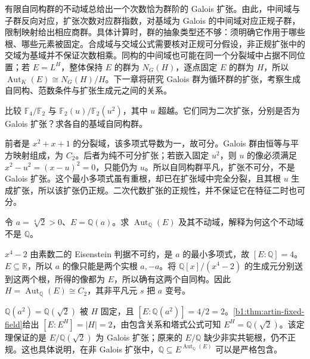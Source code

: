 




\begin{chaptersummary}
	有限自同构群的不动域总给出一个次数恰为群阶的 Galois 扩张。由此，中间域与子群反向对应，扩张次数对应群指数，对基域为 Galois 的中间域对应正规子群，限制映射给出相应商群。具体计算时，群的抽象类型还不够：须明确它作用于哪些根、哪些元素被固定。合成域与交域公式需要核对正规可分假设，非正规扩张中的交域为基域并不保证次数相乘。同构的中间域也可能在同一个分裂域中占据不同位置；若 \(E=L^H\)，整体保持 \(E\) 的群为 \(N_G(H)\)，逐点固定 \(E\) 的群为 \(H\)，所以 \(\operatorname{Aut}_K(E)\cong N_G(H)/H\)。下一章将研究 Galois 群为循环群的扩张，考察生成自同构、范数条件与扩张生成元之间的关系。
\end{chaptersummary}

\BookExercises

\begin{exercise}\label{b1:ex:19-characteristic-two}
	比较 \(\mathbb F_4/\mathbb F_2\) 与 \(\mathbb F_2(u)/\mathbb F_2(u^2)\)，其中 \(u\) 超越。它们同为二次扩张，分别是否为 Galois 扩张？求各自的基域自同构群。
\end{exercise}
\begin{solution}
	前者是 \(x^2+x+1\) 的分裂域，该多项式导数为一，故可分。Galois 群由恒等与平方映射组成，为 \(C_2\)。后者为纯不可分扩张；若嵌入固定 \(u^2\)，则 \(u\) 的像必须满足 \(x^2-u^2=(x-u)^2=0\)，只能仍为 \(u\)。所以自同构群平凡，扩张不可分，不是 Galois 扩张。这个最小多项式虽有重根，却已在扩张域中完全分裂，且其根 \(u\) 生成扩张，所以该扩张仍正规。二次代数扩张的正规性，并不保证它在特征二时也可分。
\end{solution}

\begin{exercise}\label{b1:ex:19-real-fourth-root}
	令 \(a=\sqrt[4]2>0\)、\(E=\mathbb Q(a)\)。求 \(\operatorname{Aut}_{\mathbb Q}(E)\) 及其不动域，解释为何这个不动域不是 \(\mathbb Q\)。
\end{exercise}
\begin{solution}
	\(x^4-2\) 由素数二的 Eisenstein 判据不可约，是 \(a\) 的最小多项式，故 \([E:\mathbb Q]=4\)。\(E\subseteq\mathbb R\)，所以 \(a\) 的像只能是两个实根 \(a,-a\)。将 \(\mathbb Q[x]/(x^4-2)\) 的生成元分别送到这两个根，所得的像都为 \(E\)，所以确有这两个自同构。因此 \(H=\operatorname{Aut}_{\mathbb Q}(E)\cong C_2\)，其非平凡元 \(s\) 把 \(a\) 变号。

	\(\mathbb Q(a^2)=\mathbb Q(\sqrt2)\) 被 \(H\) 固定，且 \([E:\mathbb Q(a^2)]=4/2=2\)。\cref{b1:thm:artin-fixed-field}给出 \([E:E^H]=|H|=2\)，由包含关系和塔式公式可知 \(E^H=\mathbb Q(\sqrt2)\)。该定理保证的是 \(E/\mathbb Q(\sqrt2)\) 为 Galois 扩张；原来的 \(E/\mathbb Q\) 缺少非实共轭根，仍不正规。这也具体说明，在非 Galois 扩张中，\(\mathbb Q\subseteq E^{\operatorname{Aut}_{\mathbb Q}(E)}\) 可以是严格包含。
\end{solution}

